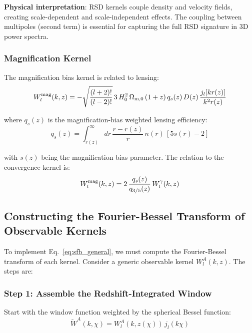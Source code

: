 \textbf{Physical interpretation}: RSD kernels couple density and velocity fields, creating scale-dependent and scale-independent effects. The coupling between multipoles (second term) is essential for capturing the full RSD signature in 3D power spectra.

\subsubsection{Magnification Kernel}

The magnification bias kernel is related to lensing:
\begin{equation}
\label{eq:kernel_mag}
W^{\rm mag}_l(k, z) = -\sqrt{\frac{(l+2)!}{(l-2)!}} \, 3 \, H_0^2 \, \Omega_{{\rm m},0} \, (1+z) \, q_s(z) \, D(z) \, \frac{j_l[k r(z)]}{k^2 r(z)}
\end{equation}

where $q_s(z)$ is the magnification-bias weighted lensing efficiency:
\begin{equation}
q_s(z) = \int_{r(z)}^\infty d r \, \frac{r - r(z)}{r} \, n(r) \, [5 s(r) - 2]
\end{equation}

with $s(z)$ being the magnification bias parameter. The relation to the convergence kernel is:
\begin{equation}
\label{eq:mag_gamma_relation}
W^{\rm mag}_l(k,z) = 2 \, \frac{q_s(z)}{q_{3/5}(z)} \, W^\gamma_l(k,z)
\end{equation}

\subsection{Constructing the Fourier-Bessel Transform of Observable Kernels}

To implement Eq.~\ref{eq:sfb_general}, we must compute the Fourier-Bessel transform of each kernel. Consider a generic observable kernel $W_l^A(k, z)$. The steps are:

\subsubsection{Step 1: Assemble the Redshift-Integrated Window}

Start with the window function weighted by the spherical Bessel function:
\begin{equation}
\label{eq:window_construction}
\widetilde{W}^A(k, \chi) = W_l^A(k, z(\chi)) \, j_l(k \chi)
\end{equation}

